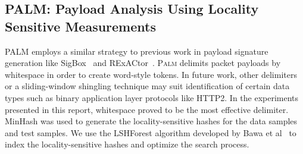 \subsection{PALM: Payload Analysis Using Locality Sensitive Measurements}
\textsc{PALM} employs a similar strategy to previous work in payload signature generation like SigBox~\cite{sigbox} and RExACtor~\cite{rexactor}. \textsc{Palm} delimits packet payloads by whitespace in order to create word-style tokens. In future work, other delimiters or a sliding-window shingling technique may suit identification of certain data types such as binary application layer protocols like HTTP2. In the experiments presented in this report, whitespace proved to be the most effective delimiter. MinHash was used to generate the locality-sensitive hashes for the data samples and test samples. We use the LSHForest algorithm developed by Bawa et al~\cite{lshforest} to index the locality-sensitive hashes and optimize the search process.
